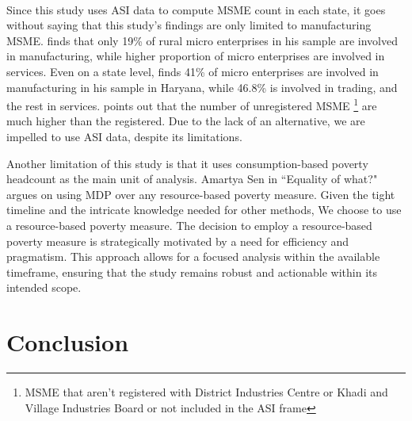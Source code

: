 \documentclass [12pt]{article}
\begin{document}
\paragraph{}
Since this study uses ASI data to compute MSME count in each state, it goes without saying that this study's findings are only limited to manufacturing MSME. \textcite{kanitkar1994entrepreneurs} finds that only 19\%  of rural micro enterprises in his sample are involved in manufacturing, while higher proportion of micro enterprises are involved in services. Even on a state level, \textcite{mor2020survival} finds 41\% of micro enterprises are involved in manufacturing in his sample in Haryana, while 46.8\% is involved in trading, and the rest in services. \textcite{manna2017status} points out that the number of unregistered MSME \footnote{MSME that aren't registered with District Industries Centre or Khadi and Village Industries Board or not included in the ASI frame} are much higher than the registered. Due to the lack of an alternative, we are impelled to use ASI data, despite its limitations.  

\text Another limitation of this study is that it uses consumption-based poverty headcount as the main unit of analysis. Amartya Sen in ``Equality of what?"  argues on using MDP over any resource-based poverty measure. Given the tight timeline and the intricate knowledge needed for other methods, We choose to use a resource-based poverty measure. The decision to employ a resource-based poverty measure is strategically motivated by a need for efficiency and pragmatism. This approach allows for a focused analysis within the available timeframe, ensuring that the study remains robust and actionable within its intended scope.

\section{Conclusion}
\end{document}
